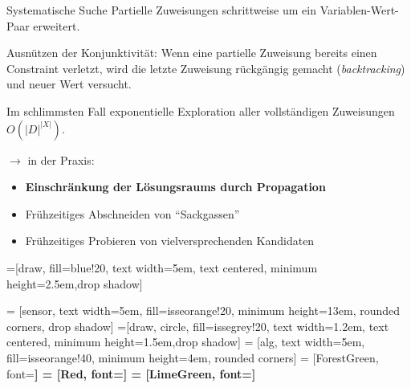 \documentclass[handout,10pt,xcolor={dvipsnames},fleqn]{beamer}
\begin{document}
\begin{frame}{Systematische Suche}
Partielle Zuweisungen schrittweise um ein Variablen-Wert-Paar erweitert.

\vspace*{2ex}

Ausnützen der Konjunktivität: Wenn eine partielle Zuweisung bereits \alert{einen} Constraint verletzt, wird die
letzte Zuweisung \alert{rückgängig} gemacht (\emph{backtracking}) und neuer Wert versucht.

\vspace*{2ex}

Im schlimmsten Fall exponentielle Exploration aller vollständigen Zuweisungen $O(|D|^{|X|})$.

\vspace*{1ex}

$\rightarrow$ in der Praxis: 

\begin{itemize}
\item \textbf{Einschränkung der Lösungsraums durch \alert{Propagation}}
\item Frühzeitiges Abschneiden von ``\alert{Sackgassen}''
\item Frühzeitiges Probieren von \alert{vielversprechenden} Kandidaten
\end{itemize}
\end{frame}

=[draw, fill=blue!20, text width=5em, 
    text centered, minimum height=2.5em,drop shadow]    
    
 = [sensor, text width=5em, fill=isseorange!20, 
    minimum height=13em, rounded corners, drop shadow]
=[draw, circle, fill=issegrey!20, text width=1.2em, 
    text centered, minimum height=1.5em,drop shadow]
 = [alg, text width=5em, fill=isseorange!40, 
    minimum height=4em, rounded corners]
 = [ForestGreen, font=\bfseries]
 = [Red, font=\bfseries]
 = [LimeGreen, font=\bfseries]
        

\end{document}
